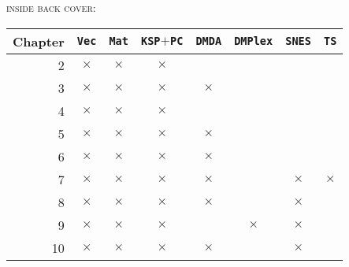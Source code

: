 \documentclass{tufte-book}
\theoremstyle{definition}
\newcommand{\XX}{$\bm{\times}$}  %
\newcommand{\gX}{{\color{Gray} $\times$}}
\newcommand{\pDMDA}{\texttt{DMDA}\xspace}
\newcommand{\pDMPlex}{\texttt{DMPlex}\xspace}
\newcommand{\pPC}{\texttt{PC}\xspace}
\newcommand{\pSNES}{\texttt{SNES}\xspace}
\newcommand{\pTS}{\texttt{TS}\xspace}
\newcommand{\pMat}{\texttt{Mat}\xspace}
\newcommand{\pVec}{\texttt{Vec}\xspace}
\begin{document}
\newpage\thispagestyle{empty}
\noindent \textsc{inside back cover:}

\vfill
\begin{center}
\begin{tabular}{rccccccc}
\toprule
Chapter 
    &\;\pVec\;
          &\;\pMat\;
                &\;\texttt{KSP}${+}$\pPC\;
                      &\pDMDA
                            &\pDMPlex
                                  &\pSNES
                                        &\;\pTS\; \\
\midrule
2   & \XX & \XX & \XX &     &     &     &      \\
3   & \XX & \XX & \XX & \XX &     &     &      \\
4   & \XX & \XX & \XX &     &     &     &      \\
5   & \gX & \gX & \XX & \XX &     &     &      \\
6   & \gX & \gX & \XX & \XX &     &     &      \\
7   & \gX & \gX & \XX & \XX &     & \XX & \XX  \\
8   & \gX & \gX & \gX & \XX &     & \XX &      \\
9   & \gX & \gX & \XX &     & \XX & \XX &      \\
10  & \gX & \gX & \gX & \XX &     & \XX &      \\
\bottomrule
\end{tabular}
\end{center}
\vfill
\end{document}
